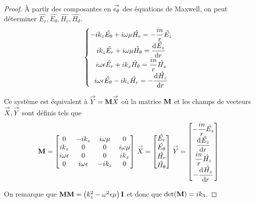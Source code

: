   \begin{proof}
    À partir des composantes en \(\vect{e_\theta}\) des équations de Maxwell, on peut déterminer \(\hat{E_r},\hat{E_\theta},\hat{H_r},\hat{H_\theta}\).
    \begin{equation*}
      \left\lbrace
      \begin{matrix}
        -ik_z\hat{E_\theta} + i\w\mu \hat{H_r} = -\frac{in}{r}\hat{E_z}
        \\
        ik_z\hat{E_r} + i\w\mu \hat{H_\theta} = \ddp{r}{\hat{E_z}}
        \\
        i\w\eps \hat{E_r} + ik_z \hat{H_\theta} = \frac{in}{r}\hat{H_z}
        \\
        i\w\eps \hat{E_\theta} - ik_z \hat{H_r} = -\ddp{r}{\hat{H_z}}
      \end{matrix}
      \right.
    \end{equation*}

    Ce système est équivalent à \(\vect{Y} = \mat{M}\vect{X}\) où la matrice \(\mat{M}\) et les champs de vecteurs \(\vect{X}, \vect{Y}\) sont définis tels que
    \begin{equation*}
      \mat{M} =
      \begin{bmatrix}
      0 & -ik_z & i\w\mu & 0
      \\
      ik_z & 0 & 0 & i\w\mu
      \\
      i\w\eps & 0 & 0 & ik_z
      \\
      0 & i\w\eps & -ik_z & 0
      \end{bmatrix}
      \,
      \vect{X} =
      \begin{bmatrix}
        \hat{E_r}\\
        \hat{E_\theta}\\
        \hat{H_r}\\
        \hat{H_\theta}
      \end{bmatrix}
      \,
      \vect{Y} =
      \begin{bmatrix}
        -\frac{in}{r}\hat{E_z}\\
        \ddp{r}{\hat{E_z}}\\
        \frac{in}{r}\hat{H_z}\\
        -\ddp{r}{\hat{H_z}}
      \end{bmatrix}
    \end{equation*}

    On remarque que \(\mM\mM = \left(k_z^2 - \omega^2\eps\mu\right)\mI\) et donc que \(\det(\mat{M}) = ik_3\).



\end{proof}
